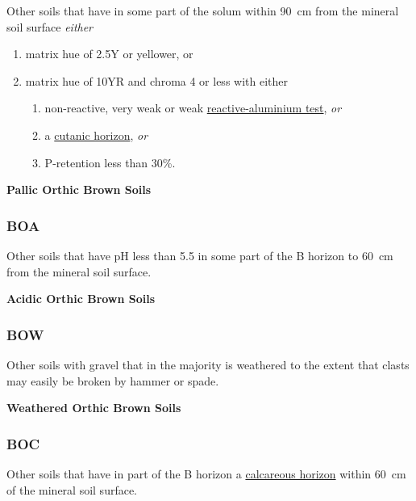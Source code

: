 \documentclass[
  letterpaper,
  DIV=11,
  numbers=noendperiod]{scrreprt}
\providecommand{\tightlist}{%
  \setlength{\itemsep}{0pt}\setlength{\parskip}{0pt}}\usepackage{longtable,booktabs,array}
\begin{document}
Other soils that have in some part of the solum within 90~cm from the
mineral soil surface \emph{either}

\begin{enumerate}
\def\labelenumi{\arabic{enumi}.}
\tightlist
\item
  matrix hue of 2.5Y or yellower, or
\item
  matrix hue of 10YR and chroma 4 or less with either

  \begin{enumerate}
  \def\labelenumii{(\alph{enumii})}
  \tightlist
  \item
    non-reactive, very weak or weak
    \protect\hyperlink{sec-diag-naf}{reactive-aluminium test}, \emph{or}
  \item
    a \protect\hyperlink{sec-diag-cuth}{cutanic horizon}, \emph{or}
  \item
    P-retention less than 30\%.
  \end{enumerate}
\end{enumerate}

\textbf{Pallic Orthic Brown Soils}

\hypertarget{sec-key-BOA}{%
\subsubsection{\texorpdfstring{\textbf{BOA}}{BOA}}\label{sec-key-BOA}}

Other soils that have pH less than 5.5 in some part of the B horizon to
60~cm from the mineral soil surface.

\textbf{Acidic Orthic Brown Soils}

\hypertarget{sec-key-BOW}{%
\subsubsection{\texorpdfstring{\textbf{BOW}}{BOW}}\label{sec-key-BOW}}

Other soils with gravel that in the majority is weathered to the extent
that clasts may easily be broken by hammer or spade.

\textbf{Weathered Orthic Brown Soils}

\hypertarget{sec-key-BOC}{%
\subsubsection{\texorpdfstring{\textbf{BOC}}{BOC}}\label{sec-key-BOC}}

Other soils that have in part of the B horizon a
\protect\hyperlink{sec-diag-calch}{calcareous horizon} within 60~cm of
the mineral soil surface.
\end{document}
